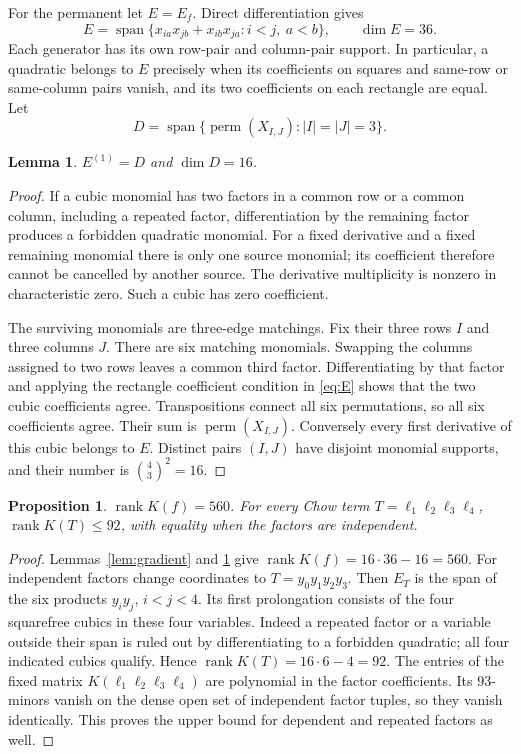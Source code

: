 \documentclass[11pt]{article}
\newtheorem{lemma}[theorem]{Lemma}
\newtheorem{proposition}[theorem]{Proposition}
\theoremstyle{remark}
\newcommand{\Span}{\operatorname{span}}
\newcommand{\rank}{\operatorname{rank}}
\newcommand{\perm}{\operatorname{perm}}
\begin{document}
For the permanent let $E=E_f$. Direct differentiation gives
\begin{equation}\label{eq:E}
 E=\Span\{x_{ia}x_{jb}+x_{ib}x_{ja}: i<j,\ a<b\},\qquad \dim E=36.
\end{equation}
Each generator has its own row-pair and column-pair support. In particular,
a quadratic belongs to $E$ precisely when its coefficients on squares and
same-row or same-column pairs vanish, and its two coefficients on each
rectangle are equal.
Let
\[
 D=\Span\{\perm(X_{I,J}): |I|=|J|=3\}.
\]
\begin{lemma}\label{lem:full-prolongation}
$E^{(1)}=D$ and $\dim D=16$.
\end{lemma}
\begin{proof}
If a cubic monomial has two factors in a common row or a common column,
including a repeated factor, differentiation by the remaining factor
produces a forbidden quadratic monomial. For a fixed derivative and a fixed
remaining monomial there is only one source monomial; its coefficient
therefore cannot be cancelled by another source. The derivative multiplicity
is nonzero in characteristic zero. Such a cubic has zero coefficient.

The surviving monomials are three-edge matchings. Fix their three rows $I$
and three columns $J$. There are six matching monomials. Swapping the columns
assigned to two rows leaves a common third factor. Differentiating by that
factor and applying the rectangle coefficient condition in \eqref{eq:E}
shows that the two cubic coefficients agree. Transpositions connect all six
permutations, so all six coefficients agree. Their sum is
$\perm(X_{I,J})$. Conversely every first derivative of this cubic belongs
to $E$. Distinct pairs $(I,J)$ have disjoint monomial supports, and their
number is $\binom43^2=16$.
\end{proof}

\begin{proposition}\label{prop:base}
$\rank K(f)=560$. For every Chow term $T=\ell_1\ell_2\ell_3\ell_4$,
$\rank K(T)\leq92$, with equality when the factors are independent.
\end{proposition}
\begin{proof}
Lemmas~\ref{lem:gradient} and \ref{lem:full-prolongation} give
$\rank K(f)=16\cdot36-16=560$.
For independent factors change coordinates to $T=y_0y_1y_2y_3$.
Then $E_T$ is the span of the six products $y_iy_j$, $i<j<4$.
Its first prolongation consists of the four squarefree cubics in these four
variables. Indeed a repeated factor or a variable outside their span is
ruled out by differentiating to a forbidden quadratic; all four indicated
cubics qualify. Hence $\rank K(T)=16\cdot6-4=92$.
The entries of the fixed matrix $K(\ell_1\ell_2\ell_3\ell_4)$ are
polynomial in the factor coefficients. Its $93$-minors vanish on the dense
open set of independent factor tuples, so they vanish identically. This
proves the upper bound for dependent and repeated factors as well.
\end{proof}
\end{document}
